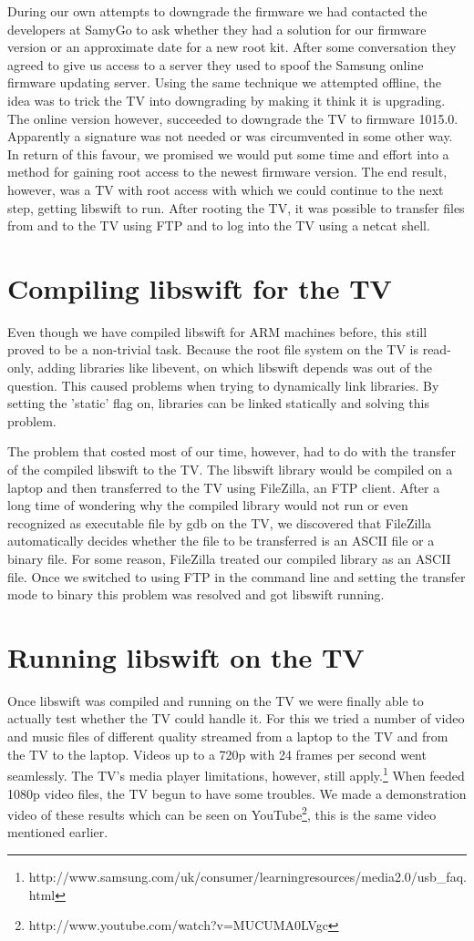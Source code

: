 During our own attempts to downgrade the firmware we had contacted the developers at SamyGo to ask 
whether they had a solution for our firmware version or an approximate date for a new root kit.
After some conversation they agreed to give us access to a server they used to spoof the Samsung online firmware updating server.
Using the same technique we attempted offline, the idea was to trick the TV into downgrading by making it think it is upgrading.
The online version however, succeeded to downgrade the TV to firmware 1015.0.
Apparently a signature was not needed or was circumvented in some other way.
In return of this favour, we promised we would put some time and effort into a method for gaining root access to the newest firmware version.
The end result, however, was a TV with root access with which we could continue to the next step, getting libswift to run.
After rooting the TV, it was possible to transfer files from and to the TV using FTP and to log into the TV using a netcat shell.

\section*{Compiling libswift for the TV}
Even though we have compiled libswift for ARM machines before, this still proved to be a non-trivial task.
Because the root file system on the TV is read-only, adding libraries like libevent, on which libswift depends was out of the question.
This caused problems when trying to dynamically link libraries.
By setting the 'static' flag on, libraries can be linked statically and solving this problem.

The problem that costed most of our time, however, 
had to do with the transfer of the compiled libswift to the TV.
The libswift library would be compiled on a laptop and then transferred to the TV using FileZilla, an FTP client.
After a long time of wondering why the compiled library would not run or even recognized as executable file by gdb on the TV,
we discovered that FileZilla automatically decides whether the file to be transferred is an ASCII file or a binary file.
For some reason, FileZilla treated our compiled library as an ASCII file.
Once we switched to using FTP in the command line and setting the transfer mode to binary this problem was resolved and got libswift running.

\section*{Running libswift on the TV}
Once libswift was compiled and running on the TV we were finally able to actually test whether the TV could handle it.
For this we tried a number of video and music files of different quality streamed from a laptop to the TV and from the TV to the laptop.
Videos up to a 720p with 24 frames per second went seamlessly.
The TV's media player limitations, however, still apply.\footnote{http://www.samsung.com/uk/consumer/learningresources/media2.0/usb\_faq.html}
When feeded 1080p video files, the TV begun to have some troubles.
We made a demonstration video of these results which can be seen on YouTube\footnote{http://www.youtube.com/watch?v=MUCUMA0LVgc},
this is the same video mentioned earlier.

